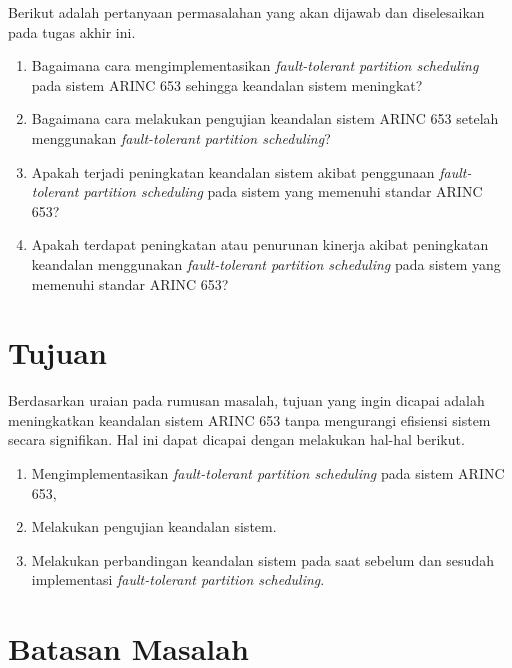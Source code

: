 Berikut adalah pertanyaan permasalahan yang akan dijawab dan diselesaikan pada tugas akhir ini.

\begin{enumerate}

	\item Bagaimana cara mengimplementasikan \textit{fault-tolerant partition scheduling} pada
		sistem ARINC 653 sehingga keandalan sistem meningkat?

	\item Bagaimana cara melakukan pengujian keandalan sistem ARINC 653 setelah menggunakan
		\textit{fault-tolerant partition scheduling}?

	\item Apakah terjadi peningkatan keandalan sistem akibat penggunaan \textit{fault-tolerant
		partition scheduling} pada sistem yang memenuhi standar ARINC 653?

	\item Apakah terdapat peningkatan atau penurunan kinerja akibat peningkatan keandalan
		menggunakan \textit{fault-tolerant partition scheduling} pada sistem yang memenuhi
		standar ARINC 653?

\end{enumerate}

\section{Tujuan}
\label{section:tujuan}

Berdasarkan uraian pada rumusan masalah, tujuan yang ingin dicapai adalah meningkatkan keandalan
sistem ARINC 653 tanpa mengurangi efisiensi sistem secara signifikan. Hal ini dapat dicapai
dengan melakukan hal-hal berikut.

\begin{enumerate}

	\item Mengimplementasikan \textit{fault-tolerant partition scheduling} pada sistem ARINC
		653,

	\item Melakukan pengujian keandalan sistem.

	\item Melakukan perbandingan keandalan sistem pada saat sebelum dan sesudah implementasi
		\textit{fault-tolerant partition scheduling}.

\end{enumerate}

\section{Batasan Masalah}
\label{section:batasan_masalah}

